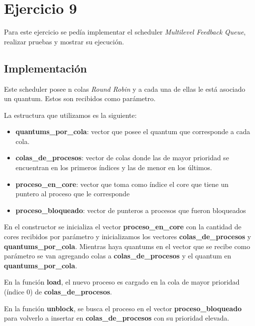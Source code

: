\section{Ejercicio 9}

Para este ejercicio se pedía implementar el scheduler \textit{Multilevel Feedback Queue}, realizar pruebas y mostrar su ejecución.

\subsection{Implementación}

Este scheduler posee n colas \emph{Round Robin} y a cada una de ellas le está asociado un quantum. Estos son recibidos como parámetro.

La estructura que utilizamos es la siguiente:

\begin{itemize}

\item \textbf{quantums\_por\_cola}: vector que posee el quantum que corresponde a cada cola.

\item \textbf{colas\_de\_procesos}: vector de colas donde las de mayor prioridad se encuentran en los primeros índices y las de menor en los últimos.

\item \textbf{proceso\_en\_core}: vector que toma como índice el core que tiene un puntero al proceso que le corresponde

\item \textbf{proceso\_bloqueado}: vector de punteros a procesos que fueron bloqueados

\end{itemize}

En el constructor se inicializa el vector \textbf{proceso\_en\_core} con la cantidad de cores recibidos por parámetro y inicializamos los vectores \textbf{colas\_de\_procesos} y \textbf{quantums\_por\_cola}. Mientras haya quantums en el vector que se recibe como parámetro se van agregando colas a \textbf{colas\_de\_procesos} y el quantum en \textbf{quantums\_por\_cola}.

En la función \textbf{load}, el nuevo proceso es cargado en la cola de mayor prioridad (índice 0) de \textbf{colas\_de\_procesos}.

En la función \textbf{unblock}, se busca el proceso en el vector \textbf{proceso\_bloqueado} para volverlo a insertar en \textbf{colas\_de\_procesos} con su prioridad elevada.

